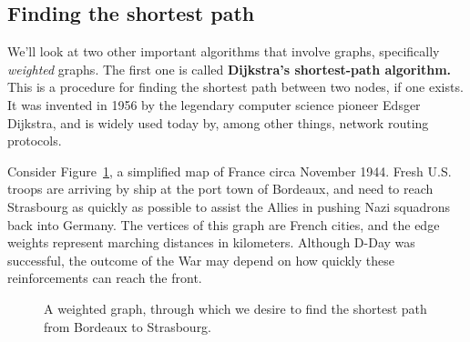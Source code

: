 \subsection{Finding the shortest path}

We'll look at two other important algorithms that involve graphs,
specifically \textit{weighted} graphs. The first one is called
\textbf{Dijkstra's shortest-path algorithm.} This is a procedure for
finding the shortest path between two nodes, if one exists. It was invented
in 1956 by the legendary computer science pioneer Edsger Dijkstra, and is
widely used today by, among other things, network routing protocols.

Consider Figure~\ref{france}, a simplified map of France circa November
1944. Fresh U.S. troops are arriving by ship at the port town of Bordeaux,
and need to reach Strasbourg as quickly as possible to assist the Allies in
pushing Nazi squadrons back into Germany. The vertices of this graph are
French cities, and the edge weights represent marching distances in
kilometers. Although D-Day was successful, the outcome of the War may
depend on how quickly these reinforcements can reach the front.

\begin{figure}[ht]
\centering
\caption{A weighted graph, through which we desire to find the shortest
path from Bordeaux to Strasbourg.}
\label{france}
\end{figure}

